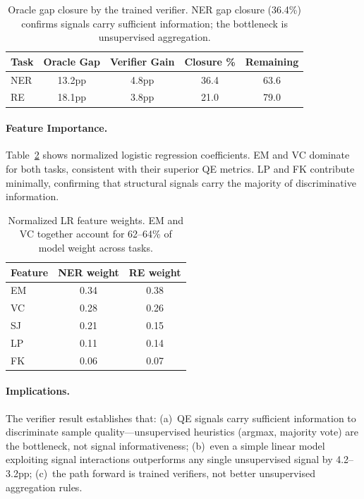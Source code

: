 \documentclass[11pt,a4paper]{article}
\begin{document}
\begin{table}[t]
\centering
\small
\begin{tabular}{lcccc}
\toprule
Task & Oracle Gap & Verifier Gain & Closure \% & Remaining \\
\midrule
NER & 13.2pp & 4.8pp & 36.4 & 63.6 \\
RE & 18.1pp & 3.8pp & 21.0 & 79.0 \\
\bottomrule
\end{tabular}
\caption{Oracle gap closure by the trained verifier. NER gap closure (36.4\%) confirms signals carry sufficient information; the bottleneck is unsupervised aggregation.}
\label{tab:gap_closure}
\end{table}

\paragraph{Feature Importance.} Table~\ref{tab:features} shows normalized logistic regression coefficients. EM and VC dominate for both tasks, consistent with their superior QE metrics. LP and FK contribute minimally, confirming that structural signals carry the majority of discriminative information.

\begin{table}[t]
\centering
\small
\begin{tabular}{lcc}
\toprule
Feature & NER weight & RE weight \\
\midrule
EM & 0.34 & 0.38 \\
VC & 0.28 & 0.26 \\
SJ & 0.21 & 0.15 \\
LP & 0.11 & 0.14 \\
FK & 0.06 & 0.07 \\
\bottomrule
\end{tabular}
\caption{Normalized LR feature weights. EM and VC together account for 62--64\% of model weight across tasks.}
\label{tab:features}
\end{table}

\paragraph{Implications.} The verifier result establishes that: (a)~QE signals carry sufficient information to discriminate sample quality---unsupervised heuristics (argmax, majority vote) are the bottleneck, not signal informativeness; (b)~even a simple linear model exploiting signal interactions outperforms any single unsupervised signal by 4.2--3.2pp; (c)~the path forward is trained verifiers, not better unsupervised aggregation rules.
\end{document}
